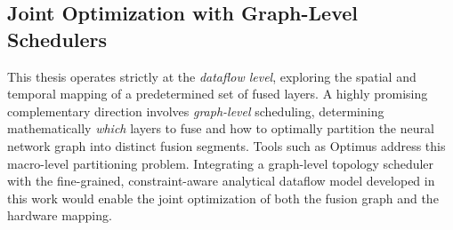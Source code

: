 \subsection{Joint Optimization with Graph-Level Schedulers}
\label{sec:fw-graph-level}

This thesis operates strictly at the \emph{dataflow level}, exploring the spatial and temporal mapping of a predetermined set of fused layers. A highly promising complementary direction involves \emph{graph-level} scheduling, determining mathematically \emph{which} layers to fuse and how to optimally partition the neural network graph into distinct fusion segments. Tools such as Optimus address this macro-level partitioning problem. Integrating a graph-level topology scheduler with the fine-grained, constraint-aware analytical dataflow model developed in this work would enable the joint optimization of both the fusion graph and the hardware mapping. 